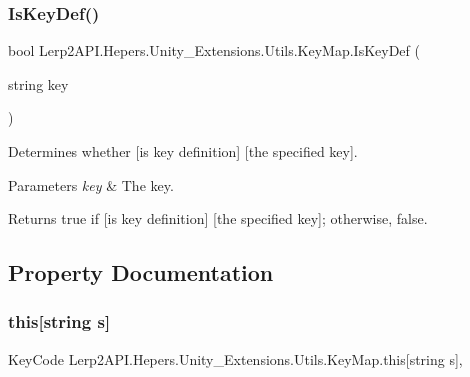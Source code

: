 \subsubsection{\texorpdfstring{Is\+Key\+Def()}{IsKeyDef()}}
{\footnotesize\ttfamily bool Lerp2\+A\+P\+I.\+Hepers.\+Unity\+\_\+\+Extensions.\+Utils.\+Key\+Map.\+Is\+Key\+Def (\begin{DoxyParamCaption}\item[{string}]{key }\end{DoxyParamCaption})\hspace{0.3cm}{\ttfamily [inline]}}



Determines whether \mbox{[}is key definition\mbox{]} \mbox{[}the specified key\mbox{]}. 


\begin{DoxyParams}{Parameters}
{\em key} & The key.\\
\hline
\end{DoxyParams}
\begin{DoxyReturn}{Returns}
{\ttfamily true} if \mbox{[}is key definition\mbox{]} \mbox{[}the specified key\mbox{]}; otherwise, {\ttfamily false}.
\end{DoxyReturn}


\subsection{Property Documentation}
\mbox{\label{class_lerp2_a_p_i_1_1_hepers_1_1_unity___extensions_1_1_utils_1_1_key_map_ae7b6c3c128e62b05a44bfb573025f06e}} 
\subsubsection{\texorpdfstring{this[string s]}{this[string s]}}
{\footnotesize\ttfamily Key\+Code Lerp2\+A\+P\+I.\+Hepers.\+Unity\+\_\+\+Extensions.\+Utils.\+Key\+Map.\+this\mbox{[}string s\mbox{]}\hspace{0.3cm}{\ttfamily [get]}, {\ttfamily [set]}}



